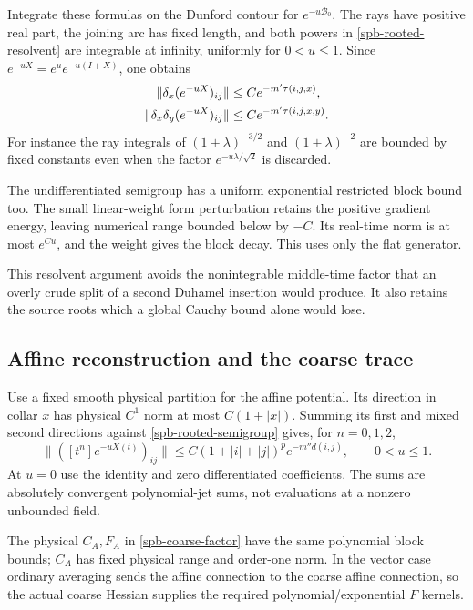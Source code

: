 Integrate these formulas on the Dunford contour for
$e^{-u\mathcal B_0}$. The rays have positive real part, the joining
arc has fixed length, and both powers in
\eqref{spb-rooted-resolvent} are integrable at infinity, uniformly
for $0<u\le1$. Since $e^{-uX}=e^u e^{-u(I+X)}$, one obtains
\begin{align}
 \|\delta_x(e^{-uX})_{ij}\|
     &\le Ce^{-m'\tau(i,j,x)},\notag\\
 \|\delta_x\delta_y(e^{-uX})_{ij}\|
     &\le Ce^{-m'\tau(i,j,x,y)}.
 \label{spb-rooted-semigroup}
\end{align}
For instance the ray integrals of $(1+\lambda)^{-3/2}$ and
$(1+\lambda)^{-2}$ are bounded by fixed constants even when the
factor $e^{-u\lambda/\sqrt2}$ is discarded.

The undifferentiated semigroup has a uniform exponential restricted
block bound too. The small linear-weight form perturbation retains
the positive gradient energy, leaving numerical range bounded below
by $-C$. Its real-time norm is at most $e^{Cu}$, and the weight gives
the block decay. This uses only the flat generator.

This resolvent argument avoids the nonintegrable middle-time factor
that an overly crude split of a second Duhamel insertion would produce.
It also retains the source roots which a global Cauchy bound alone
would lose.

\subsection{Affine reconstruction and the coarse trace}
\label{spb-trace}

Use a fixed smooth physical partition for the affine potential.
Its direction in collar $x$ has physical $C^1$ norm at most
$C(1+|x|)$. Summing its first and mixed second directions against
\eqref{spb-rooted-semigroup} gives, for $n=0,1,2$,
\begin{equation}
 \|([t^n]e^{-uX(t)})_{ij}\|
 \le C(1+|i|+|j|)^p e^{-m''d(i,j)},\qquad 0<u\le1.
 \label{spb-affine-semigroup}
\end{equation}
At $u=0$ use the identity and zero differentiated coefficients.
The sums are absolutely convergent polynomial-jet sums, not evaluations
at a nonzero unbounded field.

The physical $C_A,F_A$ in \eqref{spb-coarse-factor} have the same
polynomial block bounds; $C_A$ has fixed physical range and order-one
norm. In the vector case ordinary averaging sends the affine connection
to the coarse affine connection, so the actual coarse Hessian supplies
the required polynomial/exponential $F$ kernels.

